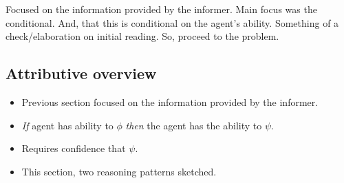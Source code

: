 \documentclass[10pt]{article}
\begin{document}
\begin{note}[Summary]
  Focused on the information provided by the informer.
  Main focus was the conditional.
  And, that this is conditional on the agent's ability.
  Something of a check/elaboration on initial reading.
  So, proceed to the problem.
\end{note}

\subsection{Attributive overview}
\label{sec:attributive-overview}

\begin{itemize}
\item Previous section focused on the information provided by the informer.
\item \emph{If} agent has ability to \(\phi\) \emph{then} the agent has the ability to \(\psi\).
\item Requires confidence that \(\psi\).
\item This section, two reasoning patterns sketched.
\end{itemize}
\end{document}
